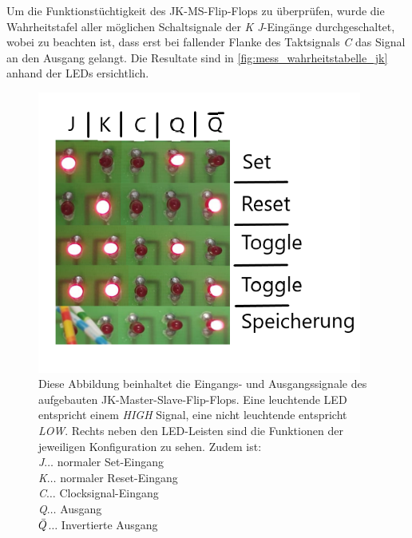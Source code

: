 \documentclass[12pt,english,ngerman]{scrartcl}
\begin{document}
Um die Funktionstüchtigkeit des JK-MS-Flip-Flops zu überprüfen, wurde die
Wahrheitstafel aller möglichen Schaltsignale der \textit{K J}-Eingänge
durchgeschaltet, wobei zu beachten ist, dass erst bei fallender Flanke des
Taktsignals \textit{C} das Signal an den Ausgang gelangt. 
Die Resultate sind in \autoref{fig:mess_wahrheitstabelle_jk}
anhand der LEDs ersichtlich.

\begin{figure}[H]
  \centering
    \includegraphics[width=0.95\textwidth]{./figures/messungen/jk/wahrheit.png}
  \caption{Diese Abbildung beinhaltet die Eingangs- und
  Ausgangssignale des aufgebauten JK-Master-Slave-Flip-Flops. Eine leuchtende
  LED entspricht einem \textit{HIGH} Signal, eine nicht leuchtende entspricht
  \textit{LOW}. Rechts neben den LED-Leisten sind die Funktionen der jeweiligen
  Konfiguration zu sehen. Zudem ist:\\ 
    \textit{J}$\dots$ normaler Set-Eingang\\
    \textit{K}$\dots$ normaler Reset-Eingang\\
    \textit{C}$\dots$ Clocksignal-Eingang\\
    \textit{Q}$\dots$ Ausgang\\
  \textit{$\Bar{Q}$}$\dots$ Invertierte Ausgang}
\label{fig:mess_wahrheitstabelle_jk}
\end{figure}
\end{document}
